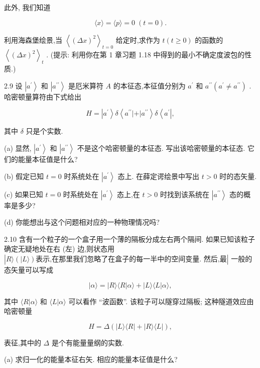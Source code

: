 \documentclass[lang=cn,newtx,10pt,scheme=chinese,thmcnt=section]{elegantbook}
\begin{document}
此外, 我们知道

$$
\langle x\rangle = \langle p\rangle = 0\;\left( {t = 0}\right) .
$$

利用海森堡绘景,当 ${\left\langle {\left( \Delta x\right) }^{2}\right\rangle }_{t = 0}$ 给定时,求作为 $t\left( {t \geq 0}\right)$ 的函数的 ${\left\langle {\left( \Delta x\right) }^{2}\right\rangle }_{t}$ . (提示: 利用你在第 1 章习题 1.18 中得到的最小不确定度波包的性质.)

2.9 设 $\left| {a}^{\prime }\right\rangle$ 和 $\left| {a}^{\prime \prime }\right\rangle$ 是厄米算符 $A$ 的本征态,本征值分别为 ${a}^{\prime }$ 和 ${a}^{\prime \prime }\left( {{a}^{\prime } \neq {a}^{\prime \prime }}\right)$ . 哈密顿量算符由下式给出

$$
H = \left| {a}^{\prime }\right\rangle \delta \left\langle {{a}^{\prime \prime }\left| +\right| {a}^{\prime \prime }}\right\rangle \delta \left\langle {a}^{\prime }\right| ,
$$

其中 $\delta$ 只是个实数.

(a) 显然, $\left| {a}^{\prime }\right\rangle$ 和 $\left| {a}^{\prime \prime }\right\rangle$ 不是这个哈密顿量的本征态. 写出该哈密顿量的本征态. 它们的能量本征值是什么?

(b) 假定已知 $t = 0$ 时系统处在 $\left| {a}^{\prime }\right\rangle$ 态上. 在薛定谔绘景中写出 $t > 0$ 时的态矢量.

(c) 如果已知 $t = 0$ 时系统处在 $\left| {a}^{\prime }\right\rangle$ 态上,在 $t > 0$ 时找到该系统在 $\left| {a}^{\prime \prime }\right\rangle$ 态的概率是多少?

(d) 你能想出与这个问题相对应的一种物理情况吗?

2.10 含有一个粒子的一个盒子用一个薄的隔板分成左右两个隔间. 如果已知该粒子确定无疑地处在右 (左) 边,则状态用 $\left| {R\rangle \left( {|L\rangle }\right) \text{表示,在那里我们忽略了在盒子的每一半中的空间变量. 然后,最}}\right|$ 一般的态矢量可以写成

$$
\left| {\alpha \rangle = }\right| R\rangle \langle R | \alpha \rangle + | L\rangle \langle L | \alpha \rangle ,
$$

其中 $\langle R | \alpha \rangle$ 和 $\langle L | \alpha \rangle$ 可以看作 “波函数”. 该粒子可以隧穿过隔板; 这种隧道效应由哈密顿量

$$
H = \Delta \left( {\left| {L\rangle \langle R}\right| + \left| {R\rangle \langle L}\right| }\right) ,
$$

表征,其中的 $\Delta$ 是个有能量量纲的实数.

(a) 求归一化的能量本征右矢. 相应的能量本征值是什么?
\end{document}
